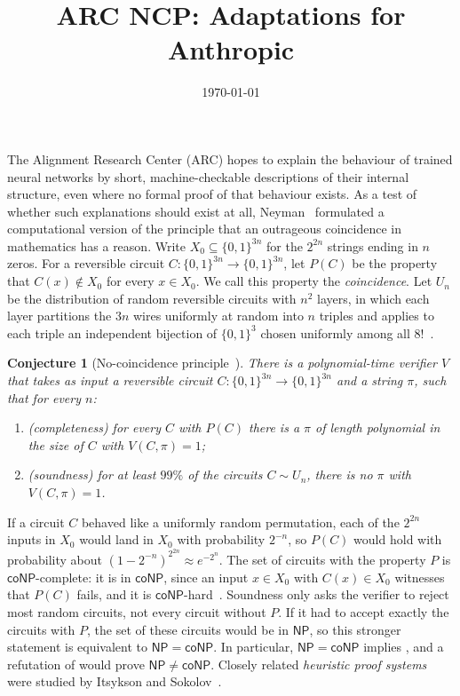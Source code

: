 \documentclass[11pt]{article}
\title{ARC NCP: Adaptations for Anthropic}
\author{}
\date{\today}
\newtheorem{conjecture}{Conjecture}
\theoremstyle{remark}
\newcommand{\NP}{\mathsf{NP}}
\newcommand{\coNP}{\mathsf{coNP}}
\begin{document}
\maketitle


The Alignment Research Center (ARC) hopes to explain the behaviour of trained neural networks by short, machine-checkable descriptions of their internal structure, even where no formal proof of that behaviour exists. As a test of whether such explanations should exist at all, Neyman~\cite{neyman2025} formulated a computational version of the principle that an outrageous coincidence in mathematics has a reason. Write $X_0 \subseteq \{0,1\}^{3n}$ for the $2^{2n}$ strings ending in $n$ zeros. For a reversible circuit $C \colon \{0,1\}^{3n} \to \{0,1\}^{3n}$, let $P(C)$ be the property that $C(x) \notin X_0$ for every $x \in X_0$. We call this property the \emph{coincidence}. Let $U_n$ be the distribution of random reversible circuits with $n^2$ layers, in which each layer partitions the $3n$ wires uniformly at random into $n$ triples and applies to each triple an independent bijection of $\{0,1\}^3$ chosen uniformly among all $8!$~\cite[footnote~3]{neyman2025}.

\begin{conjecture}[{No-coincidence principle~\cite{neyman2025}}]\label{conj:ncp}
There is a polynomial-time verifier $V$ that takes as input a reversible circuit $C \colon \{0,1\}^{3n} \to \{0,1\}^{3n}$ and a string $\pi$, such that for every $n$:
\begin{enumerate}
\item (completeness) for every $C$ with $P(C)$ there is a $\pi$ of length polynomial in the size of $C$ with $V(C, \pi) = 1$;
\item (soundness) for at least $99\%$ of the circuits $C \sim U_n$, there is no $\pi$ with $V(C, \pi) = 1$.
\end{enumerate}
\end{conjecture}

If a circuit $C$ behaved like a uniformly random permutation, each of the $2^{2n}$ inputs in $X_0$ would land in $X_0$ with probability $2^{-n}$, so $P(C)$ would hold with probability about $(1 - 2^{-n})^{2^{2n}} \approx e^{-2^n}$. The set of circuits with the property $P$ is $\coNP$-complete: it is in $\coNP$, since an input $x \in X_0$ with $C(x) \in X_0$ witnesses that $P(C)$ fails, and it is $\coNP$-hard~\cite{neyman2025}. Soundness only asks the verifier to reject most random circuits, not every circuit without $P$. If it had to accept exactly the circuits with $P$, the set of these circuits would be in $\NP$, so this stronger statement is equivalent to $\NP = \coNP$. In particular, $\NP = \coNP$ implies , and a refutation of  would prove $\NP \neq \coNP$. Closely related \emph{heuristic proof systems} were studied by Itsykson and Sokolov~\cite{itsykson-sokolov}.
\end{document}
